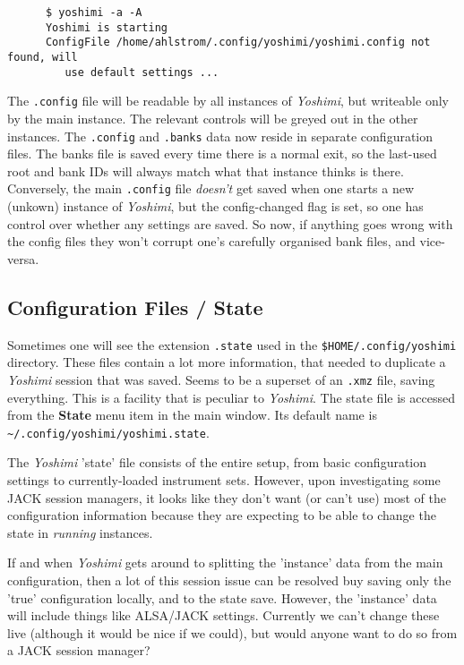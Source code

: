    \begin{verbatim}
      $ yoshimi -a -A
      Yoshimi is starting
      ConfigFile /home/ahlstrom/.config/yoshimi/yoshimi.config not found, will
         use default settings ...
   \end{verbatim}

   The \texttt{.config} file will be readable by all instances of
   \textsl{Yoshimi}, but writeable only by the main instance. The relevant
   controls will be greyed out in the other instances.  The \texttt{.config} and
   \texttt{.banks} data now reside in separate configuration files.  The banks
   file is saved every time there is a normal exit, so the last-used root and
   bank IDs will always match what that instance thinks is there.  Conversely,
   the main \texttt{.config} file \textsl{doesn't} get saved when one starts a
   new (unkown) instance of \textsl{Yoshimi}, but the config-changed flag is
   set, so one has control over whether any settings are saved.  So now, if
   anything goes wrong with the config files they won't corrupt one's carefully
   organised bank files, and vice-versa.

\subsection{Configuration Files / State}
\label{subsec:configuration_state}

   Sometimes one will see the extension \texttt{.state} used in the
   \texttt{\$HOME/.config/yoshimi} directory.  These files contain a lot more
   information, that needed to duplicate a \textsl{Yoshimi} session that was
   saved.  Seems to be a superset of an \texttt{.xmz} file, saving everything.
   This is a facility that is peculiar to \textsl{Yoshimi}.
   The state file is accessed from the \textbf{State} menu item in the main
   window.
   Its default name is
   \texttt{\textasciitilde/.config/yoshimi/yoshimi.state}.

   The \textsl{Yoshimi} 'state' file consists of the entire setup, from basic
   configuration settings to currently-loaded instrument sets.
   However, upon investigating some JACK
   session managers, it looks like they don't want (or can't use) most of the
   configuration information because they are expecting to be able to change
   the state in \textsl{running} instances.

   If and when \textsl{Yoshimi} gets around to splitting the 'instance' data
   from the main configuration, then a lot of this session issue can be resolved
   buy saving only the 'true' configuration locally, and to the state save.
   However, the 'instance' data will include things like ALSA/JACK settings.
   Currently we can't change these live (although it would be nice if we could),
   but would anyone want to do so from a JACK session manager?

